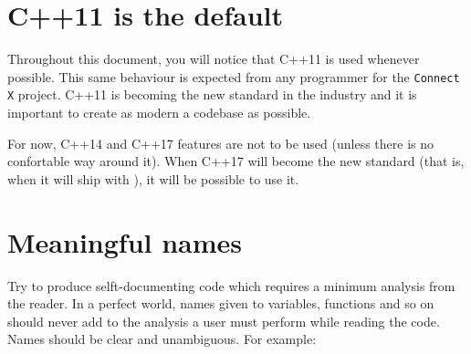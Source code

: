 %
%

%
%
%
%

\section{C++11 is the default}
Throughout this document, you will notice that C++11 is used whenever possible. 
This same behaviour is expected from any programmer for the \texttt{Connect X} 
project. C++11 is becoming the new standard in the industry and it is important 
to create as modern a codebase as possible.

For now, C++14 and C++17 features are not to be used (unless there is no 
confortable way around it). When C++17 will become the new standard (that is,
when it will ship with ), it will be possible to use it.


\section{Meaningful names}
Try to produce selft-documenting code which requires a minimum analysis from 
the reader. In a perfect world, names given to variables, functions and so on 
should never add to the analysis a user must perform while reading the code. 
Names should be clear and unambiguous. For example:


